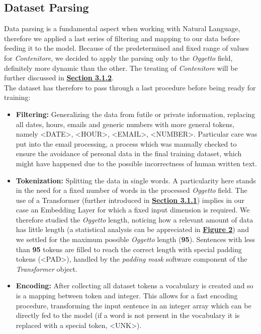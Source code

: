 \documentclass[12pt]{article}
\begin{document}
\subsection{Dataset Parsing}
Data parsing is a fundamental aspect when working with Natural Language, therefore we applied a last series of filtering and mapping to our data before feeding it to the model. Because of the predetermined and fixed range of values for \textit{Contenitore}, we decided to apply the parsing only to the \textit{Oggetto} field, definitely more dynamic than the other. The treating of \textit{Contenitore} will be further discussed in \hyperref[sec:office-module]{\textbf{Section 3.1.2}}.
\\The dataset has therefore to pass through a last procedure before being ready for training:
\begin{itemize}
    \item \textbf{Filtering:} Generalizing the data from futile or private information, replacing all dates, hours, emails and generic numbers with more general tokens, namely \textless DATE\textgreater, \textless HOUR\textgreater, \textless EMAIL\textgreater, \textless NUMBER\textgreater. Particular care was put into the email processing, a process which was manually checked to ensure the avoidance of personal data in the final training dataset, which might have happened due to the possible incorrectness of human written text.
    \item \textbf{Tokenization:} Splitting the data in single words. A particularity here stands in the need for a fixed number of words in the processed \textit{Oggetto} field. The use of a Transformer (further introduced in \hyperref[sec:object-module]{\textbf{Section 3.1.1}}) implies in our case an Embedding Layer for which a fixed input dimension is required. We therefore studied the \textit{Oggetto} length, noticing how a relevant amount of data has little length (a statistical analysis can be appreciated in \hyperref[fig:objectlength]{\textbf{Figure 2}}) and we settled for the maximum possible \textit{Oggetto} length (\textbf{95}). Sentences with less than \textbf{95} tokens are filled to reach the correct length with special padding tokens (\textless PAD\textgreater), handled by the \textit{padding mask} software component of the \textit{Transformer} object.
    \item \textbf{Encoding:} After collecting all dataset tokens a vocabulary is created and so is a mapping between token and integer. This allows for a fast encoding procedure, transforming the input sentence in an integer array which can be directly fed to the model (if a word is not present in the vocabulary it is replaced with a special token, \textless UNK\textgreater).
\end{itemize}
\end{document}
